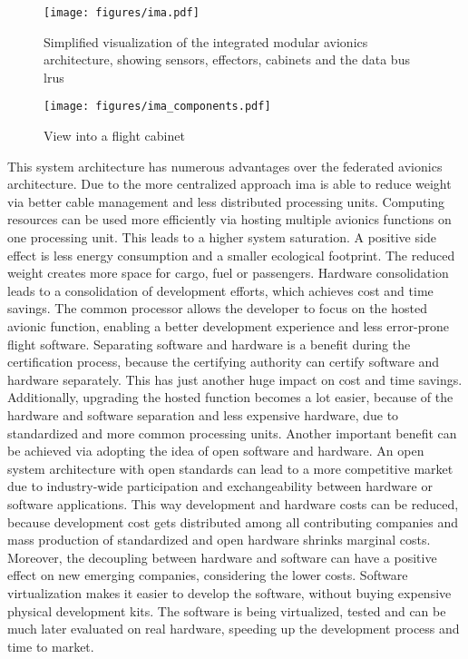 \documentclass[titlepage]{report}
\begin{document}
\begin{figure}
    \centering
    \texttt{[image: figures/ima.pdf]}
    \caption{Simplified visualization of the integrated modular avionics architecture, showing sensors, effectors, cabinets and the data bus \glspl{lru}}\label{fig:ima}
\end{figure}

\begin{figure}
    \centering
    \texttt{[image: figures/ima\_components.pdf]}
    \caption{View into a flight cabinet}\label{fig:ima_components}
\end{figure}

This system architecture has numerous advantages over the federated avionics architecture. Due to the more centralized approach \gls{ima}
is able to reduce weight via better cable management and less distributed processing units. Computing resources can be used more efficiently
via hosting multiple avionics functions on one processing unit. This leads to a higher system saturation. A positive side effect is less
energy consumption and a smaller ecological footprint. The reduced weight creates more space for cargo, fuel or passengers. 
Hardware consolidation leads to a consolidation of development efforts, which achieves cost and time savings\cite{watkins2007transitioning}.
The common processor allows the developer to focus on the hosted avionic function, enabling a better development experience and less error-prone
flight software. Separating software and hardware is a benefit during the certification process, because the certifying authority can certify
software and hardware separately. This has just another huge impact on cost and time savings. Additionally, upgrading the hosted function
becomes a lot easier, because of the hardware and software separation and less expensive hardware, due to standardized and more common
processing units. Another important benefit can be achieved via adopting the idea of open software and hardware. An open system architecture
with open standards can lead to a more competitive market due to industry-wide participation and exchangeability between hardware or
software applications. This way development and hardware costs can be reduced, because development cost gets distributed among all contributing
companies and mass production of standardized and open hardware shrinks marginal costs\cite{black2006open}. Moreover, the decoupling between hardware and software
can have a positive effect on new emerging companies, considering the lower costs\cite{watkins2007transitioning}. Software virtualization makes it easier to develop the
software, without buying expensive physical development kits. The software is being virtualized, tested and can be much later evaluated on real hardware, speeding up
the development process and time to market.
\end{document}
